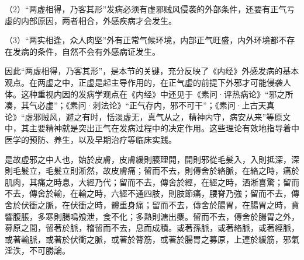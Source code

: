 \documentclass[draft,12pt]{ctexbook}
\begin{document}
（2）“两虚相得，乃客其形”发病必须有虚邪贼风侵袭的外部条件，还要有正气亏虚的内部原因，两者相合，外感疾病才会发生。

（3）“两实相逢，众人肉坚”外有正常气候环境，内部正气旺盛，内外环境都不存在发病的条件，自然不会有外感病证发生。

因此“两虚相得，乃客其形”，是本节的关键，充分反映了《内经》外感发病的基本观点。在两虚之中，正虚是起主导作用的，在正气虚的前提下外邪才可能侵袭人体。这种重视内因的发病学观点在《内经》中还见于《素问·评热病论》“邪之所凑，其气必虚”；《素问·刺法论》“正气存内，邪不可干”；《素问·上古天真论》“虚邪贼风，避之有时，恬淡虚无，真气从之，精神内守，病安从来”等原文中，其主要精神就是突出正气在发病过程中的决定作用。这些理论有效地指导着中医学的预防、养生，以及早期治疗等临床实践。


\begin{yuanwen}
是故虛邪之中人也，始於皮膚，皮膚緩則腠理開，開則邪從毛髮入，入則抵深，深則毛髪立，毛髪立則淅然，故皮膚痛；留而不去，則傳舍於絡脈，在絡之時，痛於肌肉，其痛之時息，大經乃代；留而不去，傳舍於經，在經之時，洒淅喜驚；留而不去，傳舍於輸，在輸之時，六經不通四肢，則肢節痛，腰脊乃強；留而不去，傳舍於伏衝之脈，在伏衝之時，體重身痛；留而不去，傳舍於腸胃，在腸胃之時，賁響腹脹，多寒則腸鳴飧泄，食不化；多熱則溏出麋。留而不去，傳舍於腸胃之外，募原之間，留著於脈，稽留而不去，息而成積。或著孫脈，或著絡脈，或著經脈，或著輸脈，或著於伏衝之脈，或著於膂筋，或著於腸胃之募原，上連於緩筋，邪氣淫泆，不可勝論。
\end{yuanwen}

\end{document}
